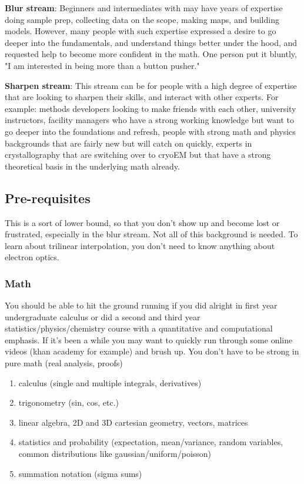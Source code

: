 \documentclass[11pt, oneside]{article}   	%
\begin{document}
{\bf  Blur stream}: Beginners and intermediates with may have years of expertise doing sample prep, collecting data on the scope, making maps, and building models. However, many people with such expertise expressed a desire to go deeper into the fundamentals, and understand things better under the hood, and requested help to become more confident in the math. One person put it bluntly, "I am interested in being more than a button pusher."

{\bf Sharpen stream}: This stream can be for people with a high degree of expertise that are looking to sharpen their skills, and interact with other experts. For example: methods developers looking to make friends with each other, university instructors, facility managers who have a strong working knowledge but want to go deeper into the foundations and refresh, people with strong math and physics backgrounds that are fairly new but will catch on quickly, experts in crystallography that are switching over to cryoEM but that have a strong theoretical basis in the underlying math already.

\subsection{Pre-requisites}
This is a sort of lower bound, so that you don't show up and become lost or frustrated, especially in the blur stream. Not all of this background is needed. To learn about trilinear interpolation, you don't need to know anything about electron optics.

\subsubsection{Math}
You should be able to hit the ground running if you did alright in first year undergraduate calculus or did a second and third year statistics/physics/chemistry course with a quantitative and computational emphasis. If it's been a while you may want to quickly run through some online videos (khan academy for example) and brush up. You don't have to be strong in pure math (real analysis, proofs)
\begin{enumerate}
	\item calculus (single and multiple integrals, derivatives)
	\item trigonometry (sin, cos, etc.)
	\item linear algebra, 2D and 3D cartesian geometry, vectors, matrices
	\item statistics and probability (expectation, mean/variance, random variables, common distributions like gaussian/uniform/poisson)
	\item summation notation (sigma sums)
\end{enumerate}
\end{document}
